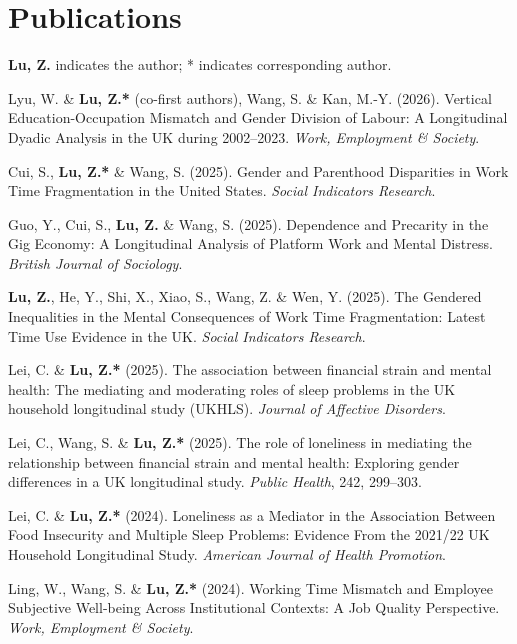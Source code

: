 \documentclass[11pt,a4paper]{article}
\begin{document}
\section*{Publications}
\textbf{Lu, Z.} indicates the author; * indicates corresponding author.
\begin{enumerate}[label={[\arabic*]}]
\item Lyu, W. \& \textbf{Lu, Z.*} (co-first authors), Wang, S. \& Kan, M.-Y. (2026). Vertical Education-Occupation Mismatch and Gender Division of Labour: A Longitudinal Dyadic Analysis in the UK during 2002--2023. \textit{Work, Employment \& Society}.

\item Cui, S., \textbf{Lu, Z.*} \& Wang, S. (2025). Gender and Parenthood Disparities in Work Time Fragmentation in the United States. \textit{Social Indicators Research}.

\item Guo, Y., Cui, S., \textbf{Lu, Z.} \& Wang, S. (2025). Dependence and Precarity in the Gig Economy: A Longitudinal Analysis of Platform Work and Mental Distress. \textit{British Journal of Sociology}.

\item \textbf{Lu, Z.}, He, Y., Shi, X., Xiao, S., Wang, Z. \& Wen, Y. (2025). The Gendered Inequalities in the Mental Consequences of Work Time Fragmentation: Latest Time Use Evidence in the UK. \textit{Social Indicators Research}.

\item Lei, C. \& \textbf{Lu, Z.*} (2025). The association between financial strain and mental health: The mediating and moderating roles of sleep problems in the UK household longitudinal study (UKHLS). \textit{Journal of Affective Disorders}.

\item Lei, C., Wang, S. \& \textbf{Lu, Z.*} (2025). The role of loneliness in mediating the relationship between financial strain and mental health: Exploring gender differences in a UK longitudinal study. \textit{Public Health}, 242, 299--303.

\item Lei, C. \& \textbf{Lu, Z.*} (2024). Loneliness as a Mediator in the Association Between Food Insecurity and Multiple Sleep Problems: Evidence From the 2021/22 UK Household Longitudinal Study. \textit{American Journal of Health Promotion}.

\item Ling, W., Wang, S. \& \textbf{Lu, Z.*} (2024). Working Time Mismatch and Employee Subjective Well-being Across Institutional Contexts: A Job Quality Perspective. \textit{Work, Employment \& Society}.


\end{enumerate}
\end{document}
